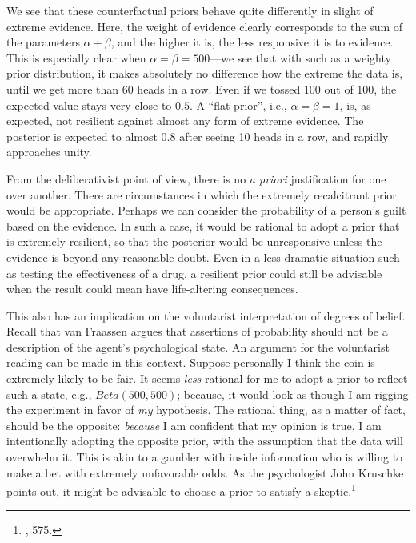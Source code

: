 We see that these counterfactual priors behave quite differently in
slight of extreme evidence. Here, the weight of evidence clearly
corresponds to the sum of the parameters \(\alpha + \beta\), and the
higher it is, the less responsive it is to evidence. This is especially
clear when \(\alpha = \beta = 500\)---we see that with such as a weighty
prior distribution, it makes absolutely no difference how the extreme
the data is, until we get more than 60 heads in a row. Even if we tossed
100 out of 100, the expected value stays very close to \(0.5\). A ``flat
prior'', i.e., \(\alpha = \beta = 1\), is, as expected, not resilient
against almost any form of extreme evidence. The posterior is expected
to almost \(0.8\) after seeing 10 heads in a row, and rapidly approaches
unity.

From the deliberativist point of view, there is no \emph{a priori}
justification for one over another. There are circumstances in which the
extremely recalcitrant prior would be appropriate. Perhaps we can
consider the probability of a person's guilt based on the evidence. In
such a case, it would be rational to adopt a prior that is extremely
resilient, so that the posterior would be unresponsive unless the
evidence is beyond any reasonable doubt. Even in a less dramatic
situation such as testing the effectiveness of a drug, a resilient prior
could still be advisable when the result could mean have life-altering
consequences.

This also has an implication on the voluntarist interpretation of
degrees of belief. Recall that van Fraassen argues that assertions of
probability should not be a description of the agent's psychological
state. An argument for the voluntarist reading can be made in this
context. Suppose personally I think the coin is extremely likely to be
fair. It seems \emph{less} rational for me to adopt a prior to reflect
such a state, e.g., \(Beta(500,500)\); because, it would look as though
I am rigging the experiment in favor of \emph{my} hypothesis. The
rational thing, as a matter of fact, should be the opposite:
\emph{because} I am confident that my opinion is true, I am
intentionally adopting the opposite prior, with the assumption that the
data will overwhelm it. This is akin to a gambler with inside
information who is willing to make a bet with extremely unfavorable
odds. As the psychologist John Kruschke points out, it might be
advisable to choose a prior to satisfy a skeptic.\footnote{\cite{bayessupert}, 575.}
%

